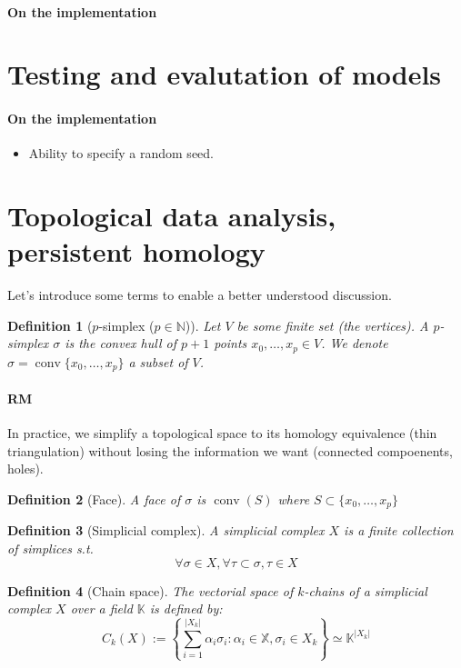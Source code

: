 \documentclass{article}
\newtheorem{definition}{Definition}
\newcommand{\N}{\mathbb{N}}
\newcommand{\K}{\mathbb{K}}
\newcommand{\RM}[1]{\paragraph{RM} #1}
\DeclareMathOperator{\conv}{conv}
\begin{document}
\paragraph{On the implementation}

\section{Testing and evalutation of models}

\paragraph{On the implementation} \begin{itemize}
  \item Ability to specify a random seed.
\end{itemize}

\section{Topological data analysis, persistent homology}

Let's introduce some terms to enable a better understood discussion.

\begin{definition}[$p$-simplex ($p\in\N$)]
  Let $V$ be some finite set (the vertices).
  A $p$-simplex $\sigma$ is the convex hull of $p+1$
  points $x_0, \ldots, x_p \in V$.
  We denote $\sigma = \conv\{x_0, \ldots, x_p\}$ a subset of $V$.
\end{definition}
\RM In practice, we simplify a topological space to its homology equivalence (thin
triangulation) without
losing the information we want (connected compoenents, holes).

\begin{definition}[Face]
  A face of $\sigma$ is $\conv(S)$ where $S\subset\{x_0,\ldots, x_p\}$
\end{definition}

\begin{definition}[Simplicial complex]
  A simplicial complex $X$ is a finite collection of simplices s.t.
  $$
  \forall \sigma\in X, \forall \tau\subset\sigma, \tau\in X
  $$
\end{definition}

\begin{definition}[Chain space]
  The vectorial space of $k$-chains of a simplicial complex $X$ over a field $\K$ is defined by:
  $$
  C_k(X) := \left\{\sum_{i=1}^{\left|X_k\right|} \alpha_i \sigma_i: \alpha_i \in \mathbb{X}, \sigma_i \in X_k\right\}
  \simeq \K^{|X_k|}
  $$
\end{definition}
\end{document}
